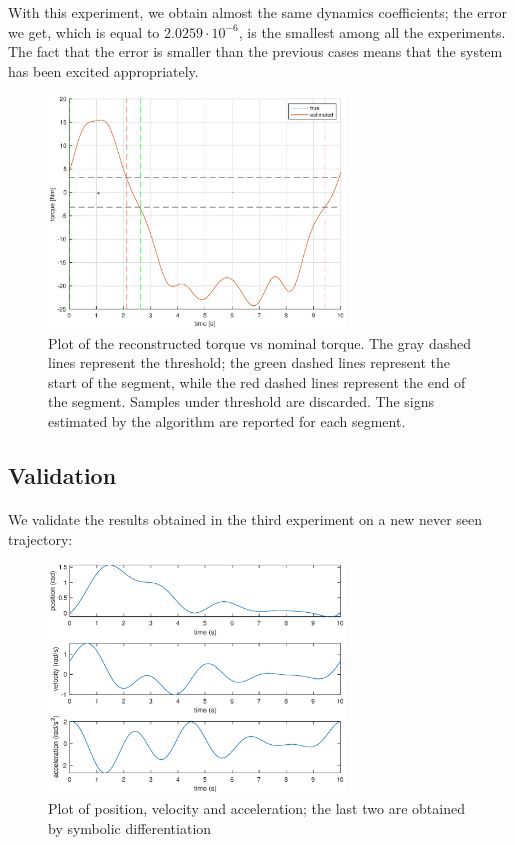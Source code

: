\documentclass{article}
\begin{document}
With this experiment, we obtain almost the same dynamics coefficients; the error we get, which is equal to $2.0259\cdot10^{-6}$, is the smallest among all the experiments.  The fact that the error is smaller than the previous cases means that the system has been excited appropriately.

\begin{figure}[!htbp]
\centering
\includegraphics[width=0.7\textwidth]{images/1-dof/results3.eps}
\caption{Plot of the reconstructed torque vs nominal torque. The gray dashed lines represent the threshold; the green dashed lines represent the start of the segment, while the red dashed lines represent the end of the segment. Samples under threshold are discarded. The signs estimated by the algorithm are reported for each segment.}
\end{figure}
\FloatBarrier

\pagebreak

\subsection{Validation} \paragraph{} We validate the results obtained in the third experiment on a new never seen trajectory:

\begin{figure}[!htbp]
\centering
\includegraphics[width=0.7\textwidth]{images/1-dof/validation_trajectory.eps}
\caption{Plot of position, velocity and acceleration; the last two are obtained by symbolic differentiation}
\end{figure}
\FloatBarrier
\end{document}
